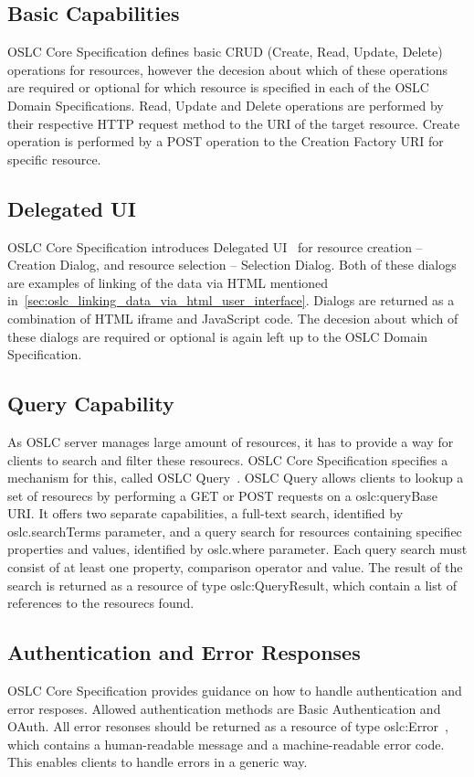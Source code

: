 \subsection*{Basic Capabilities}
OSLC Core Specification defines basic CRUD (Create, Read, Update, Delete) operations for resources, however the decesion about which of these operations are required or optional for which resource is specified in each of the OSLC Domain Specifications. Read, Update and Delete operations are performed by their respective HTTP request method to the URI of the target resource. Create operation is performed by a POST operation to the Creation Factory URI for specific resource. 

\subsection*{Delegated UI}
OSLC Core Specification introduces Delegated UI \cite{oslc_core_delegated_ui} for resource creation -- Creation Dialog, and resource selection -- Selection Dialog. Both of these dialogs are examples of linking of the data via HTML mentioned in \ref{sec:oslc_linking_data_via_html_user_interface}. Dialogs are returned as a combination of HTML iframe and JavaScript code. The decesion about which of these dialogs are required or optional is again left up to the OSLC Domain Specification.

\subsection*{Query Capability}
As OSLC server manages large amount of resources, it has to provide a way for clients to search and filter these resourecs. OSLC Core Specification specifies a mechanism for this, called OSLC Query \cite{oslc_core_query}. OSLC Query allows clients to lookup a set of resourecs by performing a GET or POST requests on a oslc:queryBase URI. It offers two separate capabilities, a full-text search, identified by oslc.searchTerms parameter, and a query search for resources containing specifiec properties and values, identified by oslc.where parameter. Each query search must consist of at least one property, comparison operator and value. The result of the search is returned as a resource of type oslc:QueryResult, which contain a list of references to the resourecs found.

\subsection*{Authentication and Error Responses}
OSLC Core Specification provides guidance on how to handle authentication and error resposes. Allowed authentication methods are Basic Authentication and OAuth. All error resonses should be returned as a resource of type oslc:Error \cite{oslc_core_error}, which contains a human-readable message and a machine-readable error code. This enables clients to handle errors in a generic way.

